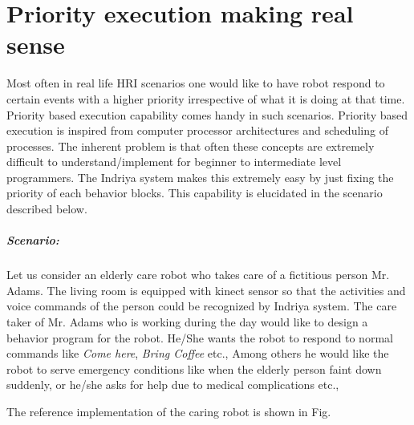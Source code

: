 \section{Priority execution making real sense}
Most often in real life HRI scenarios one would like to have robot respond to certain events with a higher priority irrespective of what it is doing at that time. Priority based execution capability comes handy in such scenarios. Priority based execution is inspired from computer processor architectures and scheduling of processes. The inherent problem is that often these concepts are extremely difficult to understand/implement for beginner to intermediate level programmers. The Indriya system makes this extremely easy by just fixing the priority of each behavior blocks. This capability is elucidated in the scenario described below. 

\subparagraph{Scenario:}Let us consider an elderly care robot who takes care of a fictitious person Mr. Adams. The living room is equipped with kinect sensor so that the activities and voice commands of the person could be recognized by Indriya system. The care taker of Mr. Adams who is working during the day would like to design a behavior program for the robot. He/She wants the robot to respond to normal commands like \emph{Come here}, \emph{Bring Coffee} etc., Among others he would like the robot to serve emergency conditions like when the elderly person faint down suddenly, or he/she asks for help due to medical complications etc.,

The reference implementation of the caring robot is shown in Fig.~

